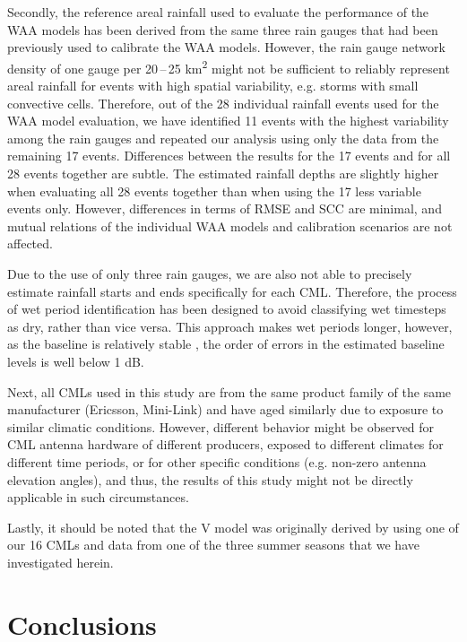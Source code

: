 \documentclass{ctuthesis}\usepackage[]{graphicx}\usepackage[]{color}
\begin{document}
Secondly, the reference areal rainfall used to evaluate the performance of the WAA models has been derived from the same three rain gauges that had been previously used to calibrate the WAA models. However, the rain gauge network density of one gauge per 20\,--\,25 km\textsuperscript{2} might not be sufficient to reliably represent areal rainfall for events with high spatial variability, e.g. storms with small convective cells. Therefore, out of the 28 individual rainfall events used for the WAA model evaluation, we have identified 11 events with the highest variability among the rain gauges and repeated our analysis using only the data from the remaining 17 events. Differences between the results for the 17 events and for all 28 events together are subtle. The estimated rainfall depths are slightly higher when evaluating all 28 events together than when using the 17 less variable events only. However, differences in terms of RMSE and SCC are minimal, and mutual relations of the individual WAA models and calibration scenarios are not affected.

Due to the use of only three rain gauges, we are also not able to precisely estimate rainfall starts and ends specifically for each CML. Therefore, the process of wet period identification has been designed to avoid classifying wet timesteps as dry, rather than vice versa. This approach makes wet periods longer, however, as the baseline is relatively stable \citep{schleissQuantificationModelingWetAntenna2013}, the order of errors in the estimated baseline levels is well below 1 dB.

Next, all CMLs used in this study are from the same product family of the same manufacturer (Ericsson, Mini-Link) and have aged similarly due to exposure to similar climatic conditions. However, different behavior might be observed for CML antenna hardware of different producers, exposed to different climates for different time periods, or for other specific conditions (e.g. non-zero antenna elevation angles), and thus, the results of this study might not be directly applicable in such circumstances.

Lastly, it should be noted that the V model was originally derived \citep{valtrExcessAttenuationCaused2019} by using one of our 16 CMLs and data from one of the three summer seasons that we have investigated herein. 



\section{Conclusions}
\end{document}
